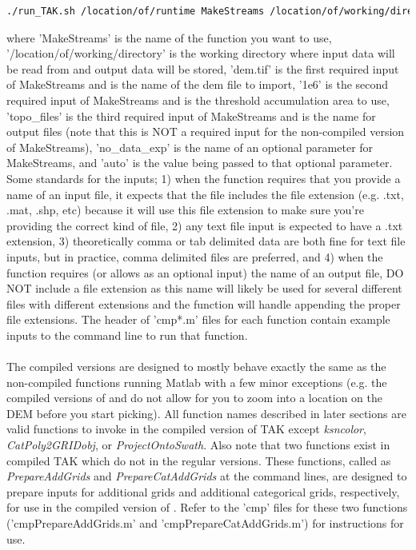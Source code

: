 \begin{lstlisting}[language=bash]
./run_TAK.sh /location/of/runtime MakeStreams /location/of/working/directory dem.tif 1e6 topo_files no_data_exp auto
\end{lstlisting}

\noindent
where 'MakeStreams' is the name of the function you want to use, '/location/of/working/directory' is the working directory where input data will be read from and output data will be stored, 'dem.tif' is the first required input of MakeStreams and is the name of the dem file to import, '1e6' is the second required input of MakeStreams and is the threshold accumulation area to use, 'topo\_files' is the third required input of MakeStreams and is the name for output files (note that this is NOT a required input for the non-compiled version of MakeStreams), 'no\_data\_exp' is the name of an optional parameter for MakeStreams, and 'auto' is the value being passed to that optional parameter. Some standards for the inputs; 1)  when the function requires that you provide a name of an input file, it expects that the file includes the file extension (e.g. .txt, .mat, .shp, etc) because it will use this file extension to make sure you're providing the correct kind of file, 2) any text file input is expected to have a .txt extension, 3) theoretically comma or tab delimited data are both fine for text file inputs, but in practice, comma delimited files are preferred, and 4) when the function requires (or allows as an optional input) the name of an output file, DO NOT include a file extension as this name will likely be used for several different files with different extensions and the function will handle appending the proper file extensions. The header of 'cmp*.m' files for each function contain example inputs to the command line to run that function.

\paragraph{}The compiled versions are designed to mostly behave exactly the same as the non-compiled functions running Matlab with a few minor exceptions (e.g. the compiled versions of  and  do not allow for you to zoom into a location on the DEM before you start picking). All function names described in later sections are valid functions to invoke in the compiled version of TAK except \textit{ksncolor}, \textit{CatPoly2GRIDobj}, or \textit{ProjectOntoSwath}. Also note that two functions exist in compiled TAK which do not in the regular versions. These functions, called as \textit{PrepareAddGrids} and \textit{PrepareCatAddGrids} at the command lines, are designed to prepare inputs for additional grids and additional categorical grids, respectively, for use in the compiled version of . Refer to the 'cmp' files for these two functions ('cmpPrepareAddGrids.m' and 'cmpPrepareCatAddGrids.m') for instructions for use. 

